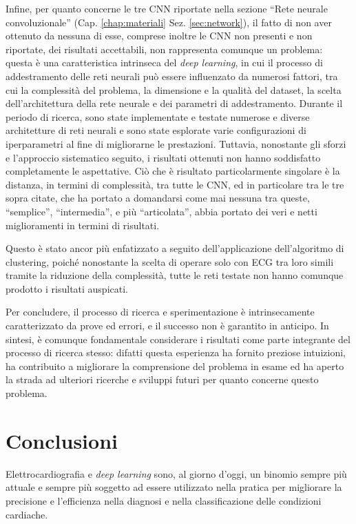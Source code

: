 \documentclass[12pt,italian]{report}
\begin{document}
	Infine, per quanto concerne le tre CNN riportate nella sezione ``Rete neurale convoluzionale'' (Cap. \ref{chap:materiali} Sez. \ref{sec:network}), il fatto di non aver ottenuto da nessuna di esse, comprese inoltre le CNN non presenti e non riportate, dei risultati accettabili, non rappresenta comunque un problema: questa è una caratteristica intrinseca del \textit{deep learning}, in cui il processo di addestramento delle reti neurali può essere influenzato da numerosi fattori, tra cui la complessità del problema, la dimensione e la qualità del dataset, la scelta dell'architettura della rete neurale e dei parametri di addestramento. Durante il periodo di ricerca, sono state implementate e testate numerose e diverse architetture di reti neurali e sono state esplorate varie configurazioni di iperparametri al fine di migliorarne le prestazioni. Tuttavia, nonostante gli sforzi e l'approccio sistematico seguito, i risultati ottenuti non hanno soddisfatto completamente le aspettative. Ciò che è risultato particolarmente singolare è la distanza, in termini di complessità, tra tutte le CNN, ed in particolare tra le tre sopra citate, che ha portato a domandarsi come mai nessuna tra queste, ``semplice'', ``intermedia'', e più ``articolata'', abbia portato dei veri e netti miglioramenti in termini di risultati.
	
	Questo è stato ancor più enfatizzato a seguito dell'applicazione dell'algoritmo di clustering, poiché nonostante la scelta di operare solo con ECG tra loro simili tramite la riduzione della complessità, tutte le reti testate non hanno comunque prodotto i risultati auspicati.
	
	Per concludere, il processo di ricerca e sperimentazione è intrinsecamente caratterizzato da prove ed errori, e il successo non è garantito in anticipo. In sintesi, è comunque fondamentale considerare i risultati come parte integrante del processo di ricerca stesso: difatti questa esperienza ha fornito preziose intuizioni, ha contribuito a migliorare la comprensione del problema in esame ed ha aperto la strada ad ulteriori ricerche e sviluppi futuri per quanto concerne questo problema.
	
	
	\chapter{Conclusioni}
	\label{chap:conclusioni}
	
	Elettrocardiografia e \textit{deep learning} sono, al giorno d'oggi, un binomio sempre più attuale e sempre più soggetto ad essere utilizzato nella pratica per migliorare la precisione e l'efficienza nella diagnosi e nella classificazione delle condizioni cardiache.
	
\end{document}
